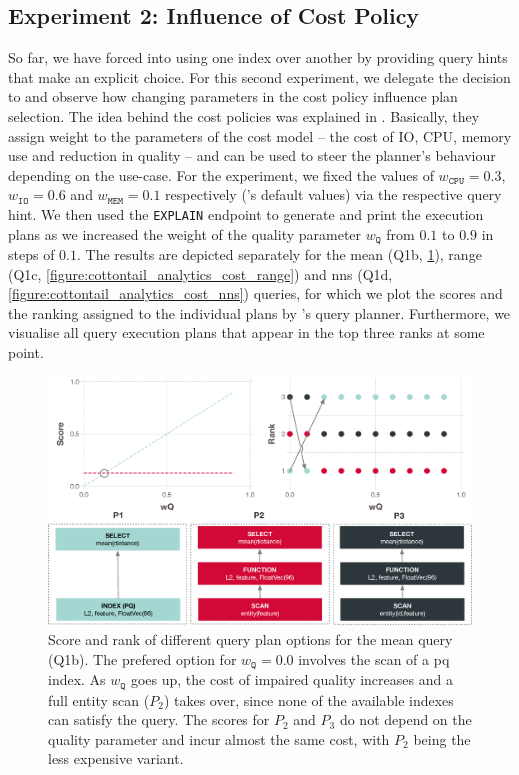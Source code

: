 \subsection{Experiment 2: Influence of Cost Policy}

So far, we have forced \cottontail{} into using one index over another by providing query hints that make an explicit choice. For this second experiment, we delegate the decision to \cottontail{} and observe how changing parameters in the cost policy influence plan selection. The idea behind the cost policies was explained in . Basically, they assign weight to the parameters of the cost model -- the cost of IO, CPU, memory use and reduction in quality -- and can be used to steer the planner's behaviour depending on the use-case. For the experiment, we fixed the values of $w_{\mathtt{CPU}} = 0.3$, $w_{\mathtt{IO}} = 0.6$ and $ w_{\mathtt{MEM}} = 0.1$ respectively (\cottontail{}'s default values) via the respective query hint. We then used the \texttt{EXPLAIN} endpoint to generate and print the execution plans as we increased the weight of the quality parameter $w_{\mathtt{Q}}$ from $0.1$ to $0.9$ in steps of $0.1$. The results are depicted separately for the mean (Q1b, \ref{figure:cottontail_analytics_cost_mean}), range (Q1c, \ref{figure:cottontail_analytics_cost_range}) and \acrshort{nns} (Q1d, \ref{figure:cottontail_analytics_cost_nns}) queries, for which we plot the scores and the ranking assigned to the individual plans by \cottontail{}'s query planner. Furthermore, we visualise all query execution plans that appear in the top three ranks at some point.

\begin{figure}[tb]
    \centering
    \includegraphics[width=\textwidth]{figures/analytics/analytics-cottontail-cost-mean-annotated}
    \caption{Score and rank of different query plan options for the mean query (Q1b). The prefered option for $w_{\texttt{Q}} = 0.0$ involves the scan of a \acrshort{pq} index. As $w_{\texttt{Q}}$ goes up, the cost of impaired quality increases and a full entity scan ($P_2$) takes over, since none of the available indexes can satisfy the query. The scores for $P_2$ and $P_3$ do not depend on the quality parameter and incur almost the same cost, with $P_2$ being the less expensive variant.}
    \label{figure:cottontail_analytics_cost_mean}
\end{figure}

